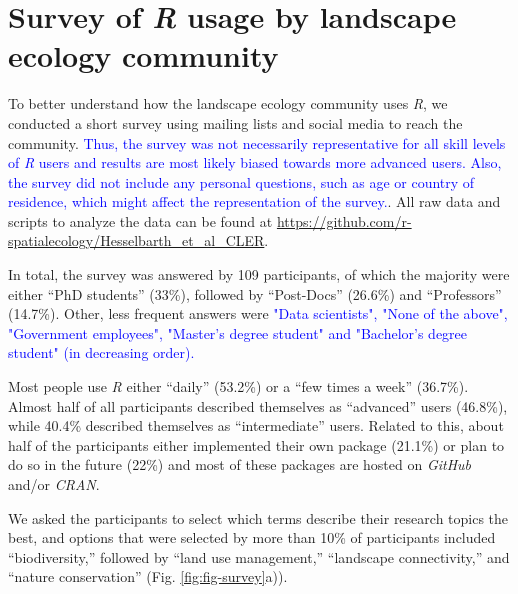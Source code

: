 \documentclass[smallextended]{svjour3}       %
\begin{document}
\begin{table}
\begin{tabularx}{1.35\linewidth}{lrXr}
\end{tabularx}

\label{tab:packages}

\end{table}

\FloatBarrier

\hypertarget{survey-of-usage-by-landscape-ecology-community}{%
\section{\texorpdfstring{Survey of \textit{R} usage by landscape ecology community}{Survey of  usage by landscape ecology community}}\label{survey-of-usage-by-landscape-ecology-community}}

To better understand how the landscape ecology community uses \textit{R}, we conducted a short survey using mailing lists and social media to reach the community. \textcolor{blue}{Thus, the survey was not necessarily representative for all skill levels of \textit{R} users and results are most likely biased towards more advanced users.
Also, the survey did not include any personal questions, such as age or country of residence, which might affect the representation of the survey.}.
All raw data and scripts to analyze the data can be found at \url{https://github.com/r-spatialecology/Hesselbarth_et_al_CLER}.

In total, the survey was answered by 109 participants, of which the majority were either ``PhD students'' (33\%), followed by ``Post-Docs'' (26.6\%) and ``Professors'' (14.7\%).
Other, less frequent answers were \textcolor{blue}{"Data scientists", "None of the above", "Government employees", "Master's degree student" and "Bachelor's degree student" (in decreasing order).}

Most people use \textit{R} either ``daily'' (53.2\%) or a ``few times a week'' (36.7\%).
Almost half of all participants described themselves as ``advanced'' users (46.8\%), while 40.4\% described themselves as ``intermediate'' users.
Related to this, about half of the participants either implemented their own package (21.1\%) or plan to do so in the future (22\%) and most of these packages are hosted on \textit{GitHub} and/or \textit{CRAN}.

We asked the participants to select which terms describe their research topics the best, and options that were selected by more than 10\% of participants included ``biodiversity,'' followed by ``land use management,'' ``landscape connectivity,'' and ``nature conservation'' (Fig. \ref{fig:fig-survey}a)).
\end{document}
